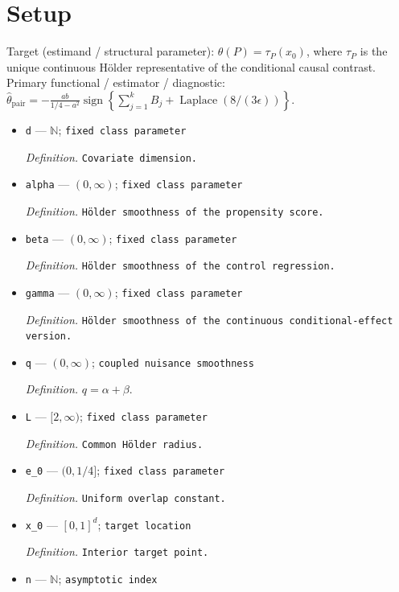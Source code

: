 \documentclass{article}
\begin{document}
\section{Setup}

Target (estimand / structural parameter): \(\theta(P)=\tau_P(x_0)\), where \(\tau_P\) is the unique continuous Hölder representative of the conditional causal contrast.
Primary functional / estimator / diagnostic: \(\widehat\theta_{\mathrm{pair}}=-\frac{ab}{1/4-a^2}\operatorname{sign}\!\left\{\sum_{j=1}^kB_j+\operatorname{Laplace}(8/(3\epsilon))\right\}\).
\begin{itemize}
  \item \texttt{d} --- \(\mathbb N\); \texttt{fixed class parameter}
  \par\smallskip\noindent\emph{Definition.} \texttt{Covariate dimension.}
  \item \texttt{alpha} --- \((0,\infty)\); \texttt{fixed class parameter}
  \par\smallskip\noindent\emph{Definition.} \texttt{Hölder smoothness of the propensity score.}
  \item \texttt{beta} --- \((0,\infty)\); \texttt{fixed class parameter}
  \par\smallskip\noindent\emph{Definition.} \texttt{Hölder smoothness of the control regression.}
  \item \texttt{gamma} --- \((0,\infty)\); \texttt{fixed class parameter}
  \par\smallskip\noindent\emph{Definition.} \texttt{Hölder smoothness of the continuous conditional-\allowbreak{}effect version.}
  \item \texttt{q} --- \((0,\infty)\); \texttt{coupled nuisance smoothness}
  \par\smallskip\noindent\emph{Definition.} \(q=\alpha+\beta\).
  \item \texttt{L} --- \([2,\infty)\); \texttt{fixed class parameter}
  \par\smallskip\noindent\emph{Definition.} \texttt{Common Hölder radius.}
  \item \texttt{e\_\allowbreak{}0} --- \((0,1/4]\); \texttt{fixed class parameter}
  \par\smallskip\noindent\emph{Definition.} \texttt{Uniform overlap constant.}
  \item \texttt{x\_\allowbreak{}0} --- \([0,1]^d\); \texttt{target location}
  \par\smallskip\noindent\emph{Definition.} \texttt{Interior target point.}
  \item \texttt{n} --- \(\mathbb N\); \texttt{asymptotic index}

\end{itemize}
\end{document}
